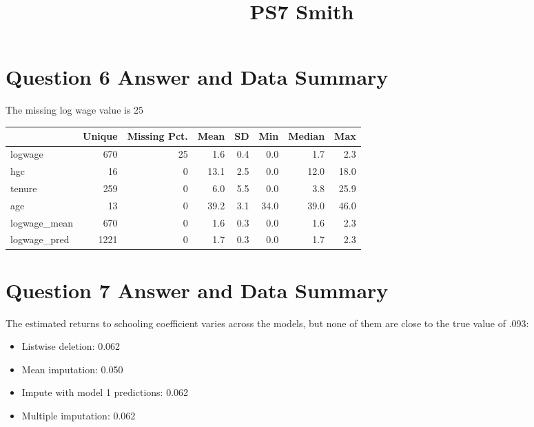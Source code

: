 \documentclass{article}
\title{PS7 Smith}
\begin{document}
\maketitle

\section{Question 6 Answer and Data Summary}
The missing log wage value is 25%

\begin{table}[h!]
\centering
\footnotesize
\begin{tabular}[T]{lrrrrrrr}
\toprule
& Unique & Missing Pct. & Mean & SD & Min & Median & Max\\
\midrule
logwage & 670 & 25 & \num{1.6} & \num{0.4} & \num{0.0} & \num{1.7} & \num{2.3}\\
hgc & 16 & 0 & \num{13.1} & \num{2.5} & \num{0.0} & \num{12.0} & \num{18.0}\\
tenure & 259 & 0 & \num{6.0} & \num{5.5} & \num{0.0} & \num{3.8} & \num{25.9}\\
age & 13 & 0 & \num{39.2} & \num{3.1} & \num{34.0} & \num{39.0} & \num{46.0}\\
logwage\_mean & 670 & 0 & \num{1.6} & \num{0.3} & \num{0.0} & \num{1.6} & \num{2.3}\\
logwage\_pred & 1221 & 0 & \num{1.7} & \num{0.3} & \num{0.0} & \num{1.7} & \num{2.3}\\
\bottomrule
\end{tabular}
\end{table}

\section{Question 7 Answer and Data Summary}

The estimated returns to schooling coefficient varies across the models, but none of them are close to the true value of .093:

\begin{itemize}
    \item Listwise deletion: 0.062
    \item Mean imputation: 0.050
    \item Impute with model 1 predictions: 0.062
    \item Multiple imputation: 0.062
\end{itemize}
\end{document}
